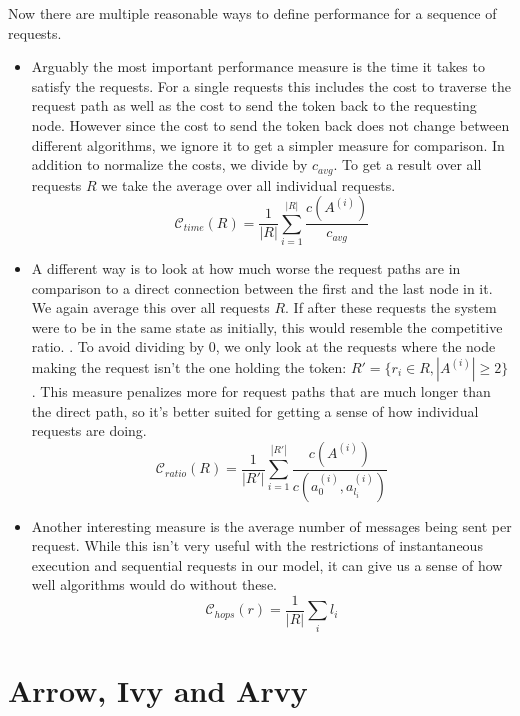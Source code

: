 \documentclass[a4paper, oneside]{discothesis}
\begin{document}
Now there are multiple reasonable ways to define performance for a sequence of requests.
\begin{itemize}
\item
  Arguably the most important performance measure is the time it takes to satisfy the requests. For a single requests this includes the cost to traverse the request path as well as the cost to send the token back to the requesting node. However since the cost to send the token back does not change between different algorithms, we ignore it to get a simpler measure for comparison. In addition to normalize the costs, we divide by $c_{avg}$. To get a result over all requests $R$ we take the average over all individual requests.
  \begin{equation}
    \mathcal{C}_{time}(R) = \frac{1}{|R|}\sum_{i=1}^{|R|}\frac{c(A^{(i)})}{c_{avg}}
  \end{equation}

\item
  A different way is to look at how much worse the request paths are in comparison to a direct connection between the first and the last node in it. We again average this over all requests $R$. If after these requests the system were to be in the same state as initially, this would resemble the competitive ratio. . To avoid dividing by $0$, we only look at the requests where the node making the request isn't the one holding the token: $R'=\{r_i\in R,|A^{(i)}|\geq 2\}$. This measure penalizes more for request paths that are much longer than the direct path, so it's better suited for getting a sense of how individual requests are doing.
  \begin{equation}
    \mathcal{C}_{ratio}(R) = \frac{1}{|R'|}\sum_{i=1}^{|R'|}\frac{c(A^{(i)})}{c(a^{(i)}_0,a^{(i)}_{l_i})}
  \end{equation}

\item
  Another interesting measure is the average number of messages being sent per request. While this isn't very useful with the restrictions of instantaneous execution and sequential requests in our model, it can give us a sense of how well algorithms would do without these.
  \begin{equation}
    \mathcal{C}_{hops}(r) = \frac{1}{|R|}\sum_il_i
  \end{equation}
\end{itemize}

\section{Arrow, Ivy and Arvy}
\end{document}
